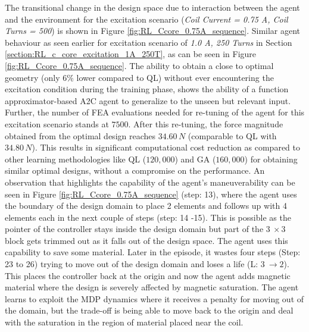 The transitional change in the design space due to interaction between the agent and the environment for the excitation scenario (\textit{Coil Current = 0.75 A, Coil Turns = 500}) is shown in Figure \ref{fig:RL_Ccore_0.75A_sequence}. Similar agent behaviour as seen earlier for excitation scenario of \textit{1.0 A, 250 Turns} in Section \ref{section:RL_c_core_excitation_1A_250T}, as can be seen in Figure \ref{fig:RL_Ccore_0.75A_sequence}. The ability to obtain a close to optimal geometry (only $6\%$ lower compared to QL) without ever encountering the excitation condition during the training phase, shows the ability of a function approximator-based A2C agent to generalize to the unseen but relevant input. Further, the number of FEA evaluations needed for re-tuning of the agent for this excitation scenario stands at $7500$. After this re-tuning, the force magnitude obtained from the optimal design reaches $34.60 \hspace{2pt} N$ (comparable to QL with $34.80 \hspace{2pt} N$). This results in significant computational cost reduction as compared to other learning methodologies like QL ($120,000$) and GA ($160,000$) for obtaining similar optimal designs, without a compromise on the performance.
An observation that highlights the capability of the agent's maneuverability can be seen in Figure \ref{fig:RL_Ccore_0.75A_sequence} (step: 13), where the agent uses the boundary of the design domain to place 2 elements and follows up with 4 elements each in the next couple of steps (step: 14 -15). This is possible as the pointer of the controller stays inside the design domain but part of the $3\ \times 3$ block gets trimmed out as it falls out of the design space. The agent uses this capability to save some material. Later in the episode, it wastes four steps (Step: 23 to 26) trying to move out of the design domain and loses a life (L: $3\ \rightarrow 2$). This places the controller back at the origin and now the agent adds magnetic material where the design is severely affected by magnetic saturation. The agent learns to exploit the MDP dynamics where it receives a penalty for moving out of the domain, but the trade-off is being able to move back to the origin and deal with the saturation in the region of material placed near the coil.

\clearpage
\newpage

